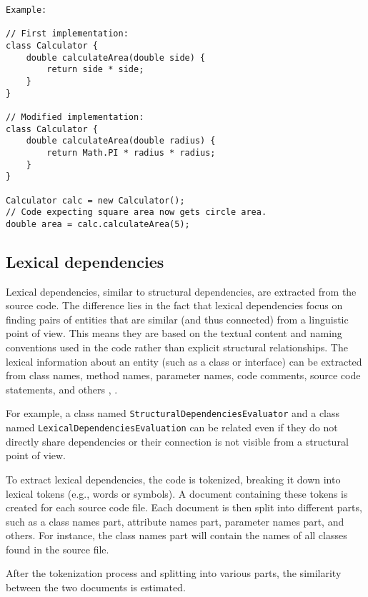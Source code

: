 \begin{verbatim}
Example:

// First implementation:
class Calculator {
    double calculateArea(double side) {
        return side * side;  
    }
}

// Modified implementation:
class Calculator {
    double calculateArea(double radius) {
        return Math.PI * radius * radius; 
    }
}

Calculator calc = new Calculator();
// Code expecting square area now gets circle area.
double area = calc.calculateArea(5);  

\end{verbatim}





\subsection{Lexical dependencies}

\hspace{4em}Lexical dependencies, similar to structural dependencies, are extracted from the source code. The difference lies in the fact that lexical dependencies focus on finding pairs of entities that are similar (and thus connected) from a linguistic point of view. This means they are based on the textual content and naming conventions used in the code rather than explicit structural relationships. The lexical information about an entity (such as a class or interface) can be extracted from class names, method names, parameter names, code comments, source code statements, and others \cite{lexical-dep}, \cite{lexical-dep-Prajapati}.

For example, a class named \texttt{StructuralDependenciesEvaluator} and a class named \texttt{LexicalDependenciesEvaluation} can be related even if they do not directly share dependencies or their connection is not visible from a structural point of view.

To extract lexical dependencies, the code is tokenized, breaking it down into lexical tokens (e.g., words or symbols). A document containing these tokens is created for each source code file. Each document is then split into different parts, such as a class names part, attribute names part, parameter names part, and others. For instance, the class names part will contain the names of all classes found in the source file.

After the tokenization process and splitting into various parts, the similarity between the two documents is estimated. 

